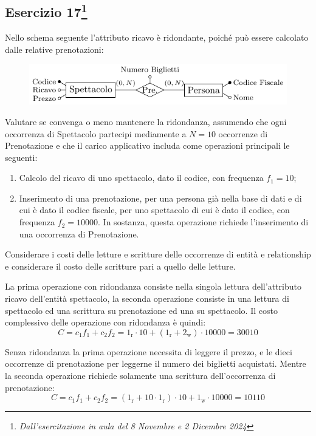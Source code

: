 \documentclass{article}
\begin{document}
\subsection{Esercizio 17\footnote{\textit{Dall'esercitazione in aula del 8 Novembre e 2 Dicembre 2024}}}

Nello schema seguente l'attributo ricavo è ridondante, poiché può essere calcolato dalle relative prenotazioni: 

\begin{figure}[H]%
    \centering
    \includegraphics[scale=1.25]{domanda_2-12-24.pdf}%
\end{figure}

Valutare se convenga o meno mantenere la ridondanza, assumendo che ogni occorrenza di Spettacolo partecipi mediamente a $N=10$ occorrenze di Prenotazione e che il carico applicativo includa 
come operazioni principali le seguenti:
\begin{enumerate}
    \item Calcolo del ricavo di uno spettacolo, dato il codice, con frequenza $f_1 = 10$;
    \item Inserimento di una prenotazione, per una persona già nella base di dati e di cui è dato il codice fiscale, per uno spettacolo di cui è dato il codice, con frequenza $f_2 = 10000$. 
    In sostanza, questa operazione richiede l'inserimento di una occorrenza di Prenotazione. 
\end{enumerate}
Considerare i costi delle letture e scritture delle occorrenze di entità e relationship e considerare il costo delle scritture pari a quello delle letture. 

La prima operazione con ridondanza consiste nella singola lettura dell'attributo ricavo dell'entità spettacolo, la seconda 
operazione consiste in una lettura di spettacolo ed una scrittura su prenotazione ed una su spettacolo. Il 
costo complessivo delle operazione con ridondanza è quindi:
\begin{equation*}
    C=c_1f_1+c_2f_2=1_\mathrm{r}\cdot10+(1_\mathrm{r}+2_\mathrm{w})\cdot10000=30010
\end{equation*}

Senza ridondanza la prima operazione necessita di leggere il prezzo, e le dieci occorrenze di 
prenotazione per leggerne il numero dei biglietti acquistati. Mentre la 
seconda operazione richiede solamente una scrittura dell'occorrenza di prenotazione:
\begin{equation*}
    C=c_1f_1+c_2f_2=(1_\mathrm{r}+10\cdot1_\mathrm{r})\cdot10+1_\mathrm{w}\cdot10000=10110
\end{equation*}
\end{document}
